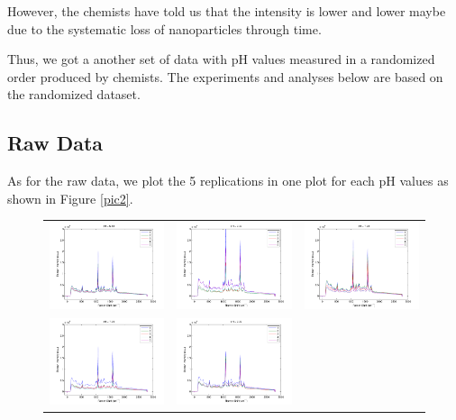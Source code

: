 \documentclass[a4paper]{article}
\begin{document}
However, the chemists have told us that the intensity is lower and lower maybe due to the systematic loss of nanoparticles through time.

Thus, we got a another set of data with pH values measured in a randomized order produced by chemists. The experiments and analyses below are based on the randomized dataset.
\subsection{Raw Data}
As for the raw data, we plot the 5 replications in one plot for each pH values as shown in Figure \ref{pic2}.
\begin{figure}[h]
\centering
\begin{tabular}{ccc}
\includegraphics[width=.33\textwidth]{images/1.pdf}  & 
\includegraphics[width=.33\textwidth]{images/2.pdf}  &
\includegraphics[width=.33\textwidth]{images/3.pdf}  \\ 
\includegraphics[width=.33\textwidth]{images/4.pdf}  &
\includegraphics[width=.33\textwidth]{images/5.pdf}  & 

\end{tabular}
\end{figure}
\end{document}
